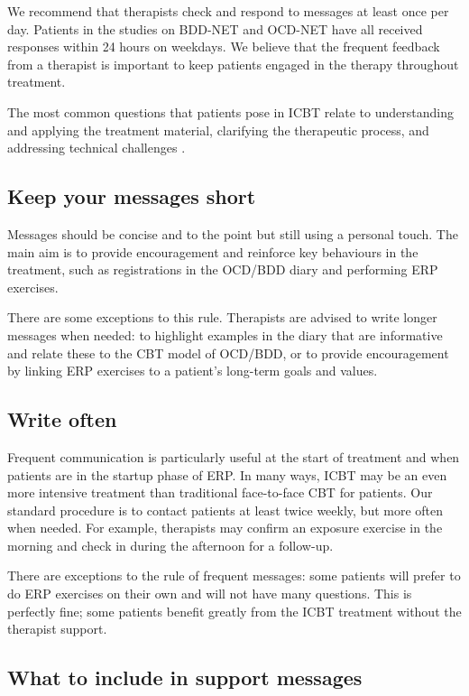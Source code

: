 \documentclass[]{book}
\theoremstyle{definition}
\theoremstyle{definition}
\theoremstyle{definition}
\theoremstyle{remark}
\begin{document}
We recommend that therapists check and respond to messages at least once
per day. Patients in the studies on BDD-NET and OCD-NET have all
received responses within 24 hours on weekdays. We believe that the
frequent feedback from a therapist is important to keep patients engaged
in the therapy throughout treatment.

The most common questions that patients pose in ICBT relate to
understanding and applying the treatment material, clarifying the
therapeutic process, and addressing technical challenges
\citep{soucy2019}.

\hypertarget{keep-your-messages-short}{%
\subsection{Keep your messages short}\label{keep-your-messages-short}}

Messages should be concise and to the point but still using a personal
touch. The main aim is to provide encouragement and reinforce key
behaviours in the treatment, such as registrations in the OCD/BDD diary
and performing ERP exercises.

There are some exceptions to this rule. Therapists are advised to write
longer messages when needed: to highlight examples in the diary that are
informative and relate these to the CBT model of OCD/BDD, or to provide
encouragement by linking ERP exercises to a patient's long-term goals
and values.

\hypertarget{write-often}{%
\subsection{Write often}\label{write-often}}

Frequent communication is particularly useful at the start of treatment
and when patients are in the startup phase of ERP. In many ways, ICBT
may be an even more intensive treatment than traditional face-to-face
CBT for patients. Our standard procedure is to contact patients at least
twice weekly, but more often when needed. For example, therapists may
confirm an exposure exercise in the morning and check in during the
afternoon for a follow-up.

There are exceptions to the rule of frequent messages: some patients
will prefer to do ERP exercises on their own and will not have many
questions. This is perfectly fine; some patients benefit greatly from
the ICBT treatment without the therapist support.

\hypertarget{what-to-include-in-support-messages}{%
\subsection{What to include in support
messages}\label{what-to-include-in-support-messages}}
\end{document}
